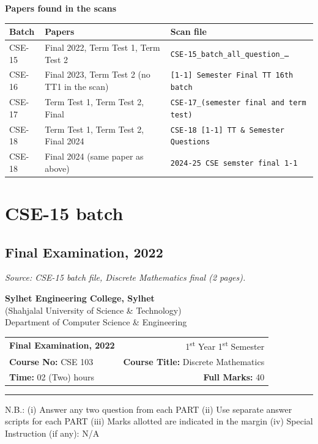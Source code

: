 \documentclass[11pt,a4paper]{article}
\makeatletter
\newcommand{\srcnote}[1]{{\footnotesize\itshape Source: #1}\par\smallskip}
\newcommand{\paperhead}[5]{%
\begin{center}
{\large\bfseries Sylhet Engineering College, Sylhet}\\
{\small (Shahjalal University of Science \& Technology)}\\
{\small Department of Computer Science \& Engineering}
\end{center}
\vspace{-2pt}
\noindent\begin{tabular*}{\linewidth}{@{}l@{\extracolsep{\fill}}r@{}}
\textbf{#1} & 1\textsuperscript{st} Year 1\textsuperscript{st} Semester\\
\textbf{Course No:} #2 & \textbf{Course Title:} #5\\
\textbf{Time:} #3 & \textbf{Full Marks:} #4
\end{tabular*}\par\smallskip\hrule\medskip}
\makeatother
\begin{document}
\bigskip
\textbf{Papers found in the scans}

\begin{center}
\small
\begin{tabular}{@{}lll@{}}
\toprule
Batch & Papers & Scan file\\
\midrule
CSE-15 & Final 2022, Term Test 1, Term Test 2 & \texttt{CSE-15\_batch\_all\_question\_\ldots}\\
CSE-16 & Final 2023, Term Test 2 (no TT1 in the scan) & \texttt{[1-1] Semester Final TT 16th batch}\\
CSE-17 & Term Test 1, Term Test 2, Final & \texttt{CSE-17\_(semester final and term test)}\\
CSE-18 & Term Test 1, Term Test 2, Final 2024 & \texttt{CSE-18 [1-1] TT \& Semester Questions}\\
CSE-18 & Final 2024 (same paper as above) & \texttt{2024-25 CSE semster final 1-1}\\
\bottomrule
\end{tabular}
\end{center}

\clearpage
\section{CSE-15 batch}
\subsection{Final Examination, 2022}
\srcnote{CSE-15 batch file, Discrete Mathematics final (2 pages).}
\paperhead{Final Examination, 2022}{CSE 103}{02 (Two) hours}{40}{Discrete Mathematics}
{\small N.B.: (i) Answer any two question from each PART \quad (ii) Use separate answer scripts for each PART \quad (iii) Marks allotted are indicated in the margin \quad (iv) Special Instruction (if any): N/A}
\end{document}
